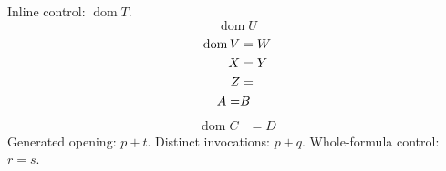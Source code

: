 \documentclass{article}
\DeclareMathOperator{\dom}{dom}
\newcommand{\authorrel}{\mathrel{\mathchoice{=}{=}{=}{=}}}
\newcommand{\openmath}{$p}
\newcommand{\closemath}{q$}
\newcommand{\wholemath}{$r=s$}
\newcommand{\openalignment}{\begin{align}\dom}
\begin{document}
Inline control: $\dom T$.
\begin{equation}\dom U\end{equation}
\begin{align}
\dom V &= W\\
X &\authorrel Y\\
Z &\authorrel\\
A\authorrel & B
\end{align}
\openalignment C &= D\end{align}
Generated opening: \openmath +t$.
Distinct invocations: \openmath +\closemath.
Whole-formula control: \wholemath.
\end{document}
